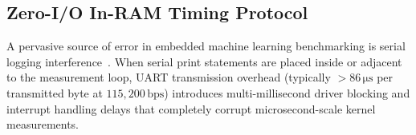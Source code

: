 \documentclass[journal,10pt]{IEEEtran}
\begin{document}
\begin{table}[t]
\centering
\footnotesize
\caption{Empirical On-Device Single-Sample Inference Latency Statistics on ESP32-D0WD-V3 ($240\,\text{MHz}$, $N=24,000$ Measured Inferences)}
\label{tab:latency_stats}
\end{table}

\subsection{Zero-I/O In-RAM Timing Protocol}
A pervasive source of error in embedded machine learning benchmarking is serial logging interference~\cite{banbury2021benchmarking,saha2022tinyml}. When serial print statements are placed inside or adjacent to the measurement loop, UART transmission overhead (typically $>86\,\si{\micro\second}$ per transmitted byte at $115,200\,\text{bps}$) introduces multi-millisecond driver blocking and interrupt handling delays that completely corrupt microsecond-scale kernel measurements.
\end{document}
